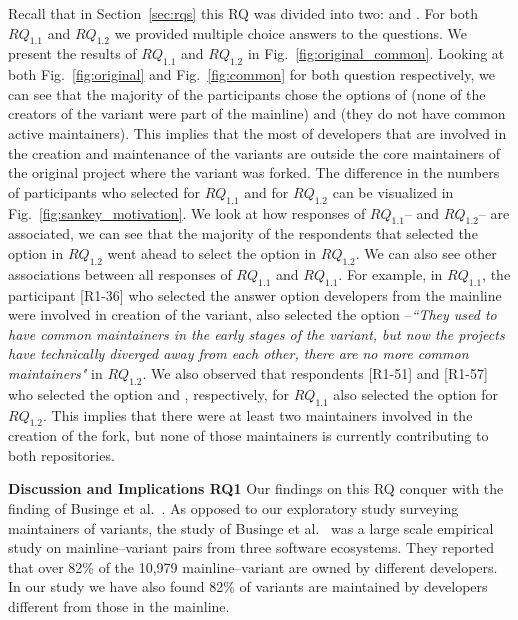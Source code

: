 \nd \textbf{\rqOne}
Recall that in Section~\ref{sec:rqs} this RQ was divided into two: \rqOneOne and \rqOneTwo.
For both $RQ_{1.1}$ and $RQ_{1.2}$ we provided multiple choice answers to the questions. We present the results of $RQ_{1.1}$ and $RQ_{1.2}$ in Fig.~\ref{fig:original_common}. Looking at both Fig.~\ref{fig:original} and Fig.~\ref{fig:common} for both question respectively, we can see that the majority of the participants chose the options of  (none of the creators of the variant were part of the mainline) and  (they do not have common active maintainers).
This implies that the most of developers that are involved in the creation and maintenance of the variants are outside the core maintainers of the original project where the variant was forked. 
The difference in the numbers of participants who selected   for $RQ_{1.1}$ and  for $RQ_{1.2}$ can be visualized in Fig.~\ref{fig:sankey_motivation}. 
We look at how responses of $RQ_{1.1}$-- and $RQ_{1.2}$-- are associated, we can see that the majority of the respondents that selected the option  in $RQ_{1.2}$ went ahead to select the option  in $RQ_{1.2}$. We can also see other associations between all responses of $RQ_{1.1}$ and $RQ_{1.1}$.
For example, in $RQ_{1.1}$, the participant [R1-36] who selected the answer option  developers from the mainline were involved in creation of the variant, also selected the option --\emph{``They used to have common maintainers in the early stages of the variant, but now the projects have technically diverged away from each other, there are no more common maintainers"} in $RQ_{1.2}$.
We also observed that respondents [R1-51] and [R1-57] who selected the option  and , respectively, for $RQ_{1.1}$ also selected the option  for $RQ_{1.2}$. This implies that there were at least two maintainers involved in the creation of the fork, but none of those maintainers is currently contributing to both repositories. 

\nd \textbf{Discussion and Implications RQ1}
Our findings on this RQ conquer with the finding of Businge et al.~\cite{businge:emse:2021}. As opposed to our exploratory study surveying maintainers of variants, the study of Businge et al.~\cite{businge:emse:2021} was a large scale empirical study on mainline--variant pairs from three software ecosystems. They reported that over 82\% of the 10,979 mainline--variant are owned by different developers. In our study we have also found 82\% of variants are maintained by developers different from those in the mainline. 


